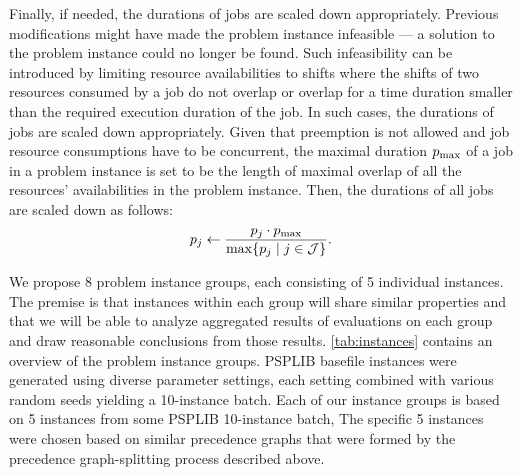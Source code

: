 Finally, if needed, the durations of jobs are scaled down appropriately.
Previous modifications might have made the problem instance infeasible
--- a solution to the problem instance could no longer be found.
Such infeasibility can be introduced by limiting resource availabilities to shifts
where the shifts of two resources consumed by a job do not overlap
or overlap for a time duration smaller than the required execution duration of the job.
In such cases, the durations of jobs are scaled down appropriately.
Given that preemption is not allowed and job resource consumptions have to be concurrent,
the maximal duration $p_{\max}$ of a job in a problem instance is set
to be the length of maximal overlap of all the resources' availabilities in the problem instance.
Then, the durations of all jobs are scaled down as follows:
$$
\duration{j} \gets \frac{\duration{j} \cdot \duration{\max}}%
                        {\max\{\duration{j} \;|\; j \in \Jobs \}}.
$$

We propose 8 problem instance groups, each consisting of 5 individual instances.
The premise is that instances within each group will share similar properties
and that we will be able to analyze aggregated results of evaluations on each group
and draw reasonable conclusions from those results.
\cref{tab:instances} contains an overview of the problem instance groups.
PSPLIB basefile instances were generated using diverse parameter settings,
each setting combined with various random seeds yielding a 10-instance batch.
Each of our instance groups is based on 5 instances from some PSPLIB 10-instance batch,
The specific 5 instances were chosen based on similar precedence graphs
that were formed by the precedence graph-splitting process described above.

